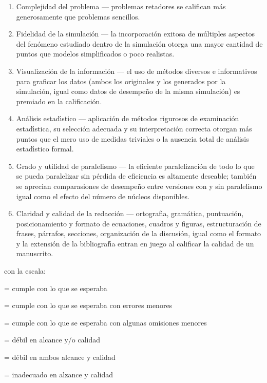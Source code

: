 \documentclass[10 pt]{article}
\begin{document}
  \begin{enumerate}[itemsep=-1pt]

  \item{Complejidad del problema --- problemas retadores se califican
      m\'{a}s generosamente que problemas sencillos.}
   \item{Fidelidad de la
    simulaci\'{o}n --- la incorporaci\'{o}n exitosa de m\'{u}ltiples aspectos del
    fen\'{o}meno estudiado dentro de la simulaci\'{o}n otorga una mayor
    cantidad de puntos que modelos simplificados o poco realistas.}
  \item{Visualizaci\'{o}n de la informaci\'{o}n --- el uso de m\'{e}todos diversos e
    informativos para graficar los datos (ambos los originales y los
    generados por la simulaci\'{o}n, igual como datos de desempe\~{n}o de la
    misma simulaci\'{o}n) es premiado en la calificaci\'{o}n.}
  \item{An\'{a}lisis
    estad\'{\i}stico --- aplicaci\'{o}n de m\'{e}todos rigurosos de examinaci\'{o}n
    estad\'{\i}stica, su selecci\'{o}n adecuada y su interpretaci\'{o}n correcta
    otorgan m\'{a}s puntos que el mero uso de medidas triviales o la
    ausencia total de an\'{a}lisis estad\'{\i}stico formal.}
  \item{Grado y utilidad
    de paralelismo --- la eficiente paralelizaci\'{o}n de todo lo que se
    pueda paralelizar sin p\'{e}rdida de eficiencia es altamente deseable;
    tambi\'{e}n se aprecian comparasiones de desempe\~{n}o entre versiones con
    y sin paralelismo igual como el efecto del n\'{u}mero de n\'{u}cleos
    disponibles.}
  \item{Claridad y calidad de la redacci\'{o}n --- ortograf\'{\i}a,
    gram\'{a}tica, puntuaci\'{o}n, posicionamiento y formato de ecuaciones,
    cuadros y figuras, estructuraci\'{o}n de frases, p\'{a}rrafos, secciones,
    organizaci\'{o}n de la discusi\'{o}n, igual como el formato y la extensi\'{o}n
    de la bibliograf\'{\i}a entran en juego al calificar la calidad de un
    manuscrito.}
  \end{enumerate}
  con la escala:
  \begin{description}[itemsep=-2pt]
  \item[5]{= cumple con lo que se esperaba}
  \item[4]{= cumple con lo que se esperaba con errores menores}
  \item[3]{= cumple con lo que se esperaba con algunas omisiones menores}    
  \item[2]{= d\'{e}bil en alcance y/o calidad}
  \item[1]{= d\'{e}bil en ambos alcance y calidad}
  \item[0]{= inadecuado en alzance y calidad}
  \end{description}
\end{document}
